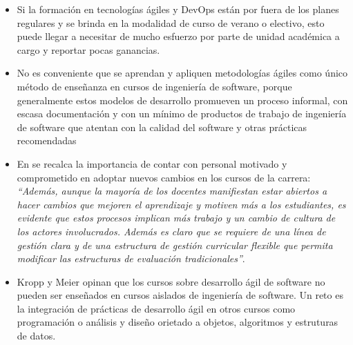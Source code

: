 \begin{itemize}
        \item Si la formación en tecnologías ágiles y DevOps están por fuera de los planes regulares y se brinda en la modalidad de curso de verano o electivo, esto puede llegar a necesitar de mucho esfuerzo por parte de unidad académica a cargo y reportar pocas ganancias\cite{hickey-salas}.
        \item No es conveniente que se aprendan y apliquen metodologías ágiles como único método de enseñanza en cursos de ingeniería de software, porque generalmente estos modelos de desarrollo promueven un proceso informal, con escasa documentación y con un mínimo de productos de trabajo de ingeniería de software que atentan con la calidad del software y otras prácticas recomendadas\cite{salazar}
        \item En \cite{mora-et-al-1} se recalca la importancia de contar con personal motivado y comprometido en adoptar nuevos cambios en los cursos de la carrera: \emph{``Además, aunque la mayoría de los docentes manifiestan estar abiertos a hacer cambios que mejoren el aprendizaje y motiven más a los estudiantes, es evidente que estos procesos implican más trabajo y un cambio de cultura de los actores involucrados. Además es claro que se requiere de una línea de gestión clara y de una estructura de gestión curricular flexible que permita modificar las estructuras de evaluación tradicionales''}.
        \item Kropp y Meier \cite{kropp-meier-1} opinan que los cursos sobre desarrollo ágil de software no pueden ser enseñados en cursos aislados de ingeniería de software. Un reto es la integración de prácticas de desarrollo ágil en otros cursos como programación o análisis y diseño orietado a objetos, algoritmos y estruturas de datos.
\end{itemize}